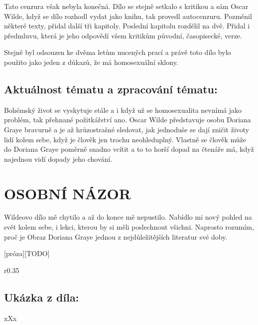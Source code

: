 \documentclass{extarticle} %
\begin{document}
\noindent
Tato cenzura však nebyla konečná.
Dílo se stejně setkalo s kritikou a sám Oscar Wilde, když se dílo rozhodl vydat jako knihu, tak provedl autocenzuru.
Pozměnil některé texty, přidal další tři kapitoly. Poslední kapitolu rozdělil na dvě. Přidal i předmluvu, která je jeho odpovědí všem kritikům původní, časopisecké, verze.

\noindent
Stejně byl odsouzen ke dvěma letům nucených prací a právě toto dílo bylo použito jako jeden z důkazů, že má homosexuální sklony.

\subsection*{Aktuálnost tématu a zpracování tématu:}
\noindent
Bohémský život se vyskytuje stále a i když už se homosexualita nevnímá jako problém, tak přehnané požitkářství ano.
Oscar Wilde představuje osobu Doriana Graye bravurně a je až hrůzostrašné sledovat, jak jednoduše se dají zničit životy lidí kolem sebe, když je člověk jen trochu neohleduplný.
Vlastně se člověk může do Doriana Graye poměrně snadno vcítit a to to horší dopad na čtenáře má, když najednou vidí dopady jeho chování.

\section*{OSOBNÍ NÁZOR}
\noindent 
Wildeovo dílo mě chytilo a až do konce mě nepustilo.
Nabídlo mi nový pohled na svět kolem sebe, i lekci, kterou by si měli poslechnout všichni.
Naprosto rozumím, proč je Obraz Doriana Graye jednou z nejdůležitějších literatur své doby.

\vfill


\newpage


\changefontsize{8pt}

[próza][TODO]

\noindent\begin{wrapfigure}{r}{0.35\textwidth}
\tiny

\subsection*{Ukázka z díla:}
\setlength{\parindent}{3pt}
xXx
\end{wrapfigure}
\end{document}
